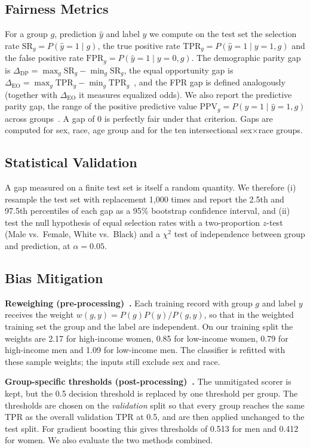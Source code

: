 \documentclass[conference]{IEEEtran}
\begin{document}
\subsection{Fairness Metrics}
For a group $g$, prediction $\hat{y}$ and label $y$ we compute on the test set the selection rate $\mathrm{SR}_g = P(\hat{y}=1\mid g)$, the true positive rate $\mathrm{TPR}_g = P(\hat{y}=1\mid y=1,g)$ and the false positive rate $\mathrm{FPR}_g = P(\hat{y}=1\mid y=0,g)$. The demographic parity gap is $\Delta_{\mathrm{DP}}=\max_g \mathrm{SR}_g-\min_g \mathrm{SR}_g$, the equal opportunity gap is $\Delta_{\mathrm{EO}}=\max_g \mathrm{TPR}_g-\min_g \mathrm{TPR}_g$~\cite{hardt2016}, and the FPR gap is defined analogously (together with $\Delta_{\mathrm{EO}}$ it measures equalized odds). We also report the predictive parity gap, the range of the positive predictive value $\mathrm{PPV}_g=P(y=1\mid\hat{y}=1,g)$ across groups~\cite{chouldechova2017}. A gap of 0 is perfectly fair under that criterion. Gaps are computed for sex, race, age group and for the ten intersectional sex$\times$race groups.

\subsection{Statistical Validation}
A gap measured on a finite test set is itself a random quantity. We therefore (i) resample the test set with replacement 1{,}000 times and report the 2.5th and 97.5th percentiles of each gap as a 95\% bootstrap confidence interval, and (ii) test the null hypothesis of equal selection rates with a two-proportion $z$-test (Male vs.\ Female, White vs.\ Black) and a $\chi^2$ test of independence between group and prediction, at $\alpha=0.05$.

\subsection{Bias Mitigation}
\textbf{Reweighing (pre-processing)~\cite{kamiran2012}.} Each training record with group $g$ and label $y$ receives the weight $w(g,y)=P(g)P(y)/P(g,y)$, so that in the weighted training set the group and the label are independent. On our training split the weights are 2.17 for high-income women, 0.85 for low-income women, 0.79 for high-income men and 1.09 for low-income men. The classifier is refitted with these sample weights; the inputs still exclude sex and race.

\textbf{Group-specific thresholds (post-processing)~\cite{hardt2016}.} The unmitigated scorer is kept, but the 0.5 decision threshold is replaced by one threshold per group. The thresholds are chosen on the \emph{validation} split so that every group reaches the same TPR as the overall validation TPR at 0.5, and are then applied unchanged to the test split. For gradient boosting this gives thresholds of 0.513 for men and 0.412 for women. We also evaluate the two methods combined.
\end{document}
